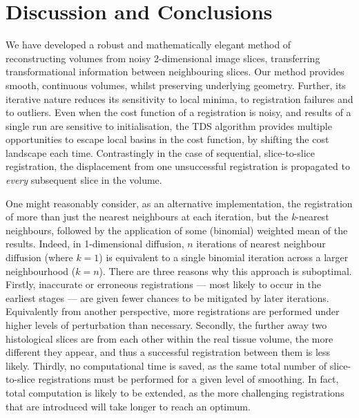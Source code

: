 \section{Discussion and Conclusions} %
\label{sec:discussion_and_conclusions}
  We have developed a robust and mathematically elegant method of reconstructing volumes from noisy 2-dimensional image slices, transferring transformational information between neighbouring slices. Our method provides smooth, continuous volumes, whilst preserving underlying geometry. Further, its iterative nature reduces its sensitivity to local minima, to registration failures and to outliers. Even when the cost function of a registration is noisy, and results of a single run are sensitive to initialisation, the TDS algorithm provides multiple opportunities to escape local basins in the cost function, by shifting the cost landscape each time. Contrastingly in the case of sequential, slice-to-slice registration, the displacement from one unsuccessful registration is propagated to \emph{every} subsequent slice in the volume.
  
  One might reasonably consider, as an alternative implementation, the registration of more than just the nearest neighbours at each iteration, but the \emph{k}-nearest neighbours, followed by the application of some (binomial) weighted mean of the results. Indeed, in 1-dimensional diffusion, $n$ iterations of nearest neighbour diffusion (where $k=1$) is equivalent to a single binomial iteration across a larger neighbourhood ($k=n$). There are three reasons why this approach is suboptimal. Firstly, inaccurate or erroneous registrations --- most likely to occur in the earliest stages --- are given fewer chances to be mitigated by later iterations. Equivalently from another perspective, more registrations are performed under higher levels of perturbation than necessary. Secondly, the further away two histological slices are from each other within the real tissue volume, the more different they appear, and thus a successful registration between them is less likely. Thirdly, no computational time is saved, as the same total number of slice-to-slice registrations must be performed for a given level of smoothing. In fact, total computation is likely to be extended, as the more challenging registrations that are introduced will take longer to reach an optimum.
  
